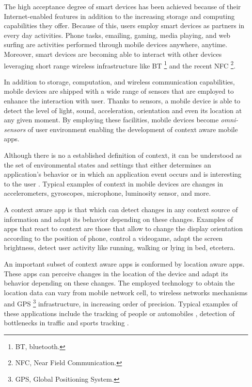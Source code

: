 \documentclass{report}
\begin{document}
The high acceptance degree of smart devices has been achieved because of their Internet-enabled features in addition to the increasing storage and computing capabilities they offer.
Because of this, users employ smart devices as partners in every day activities.
Phone tasks, emailing, gaming, media playing, and web surfing are activities performed through mobile devices anywhere, anytime.
Moreover, smart devices are becoming able to interact with other devices leveraging short range wireless infrastructure like BT \footnote{BT, bluetooth.} and the recent NFC \footnote{NFC, Near Field Communication.}.

In addition to storage, computation, and wireless communication capabilities, mobile devices are shipped with a wide range of sensors that are employed to enhance the interaction with user.
Thanks to sensors, a mobile device is able to detect the level of light, sound, acceleration, orientation and even its location at any given moment.
By employing these facilities, mobile devices become \emph{omni-sensors} \citep{Perez-Torres2012} of user environment enabling the development of context aware mobile apps.

Although there is no a established definition of context, it can be understood as the set of environmental states and settings that either determines an application’s behavior or in which an application event occurs and is interesting to the user \citep{Chen2000}.
Typical examples of context in mobile devices are changes in accelerometers, gyroscopes, microphone, luminosity sensor, and more.

A context aware app is that which can detect changes in any context source of information and adapt its behavior depending on these changes.
Examples of apps that react to context are those that allow to change the display orientation according to the position of phone, control a videogame, adapt the screen brightness, detect user activity like running, walking or lying in bed, etcetera.


An important subset of context aware apps is conformed by location aware apps.
These apps can perceive changes in the location of the device and adapt its behavior depending on these changes.
The employed technology to obtain the location data can vary from mobile network cell, to wireless networks mechanisms and GPS \footnote{GPS, Global Positioning System.} infrastructure, in increasing order of precision.
Typical examples of these applications include the tracking of people or automobiles \citep{Yuan2011}, detection of bottlenecks in traffic \citep{Thiagarajan2009} and sports tracking \citep{Lykke}.
\end{document}
